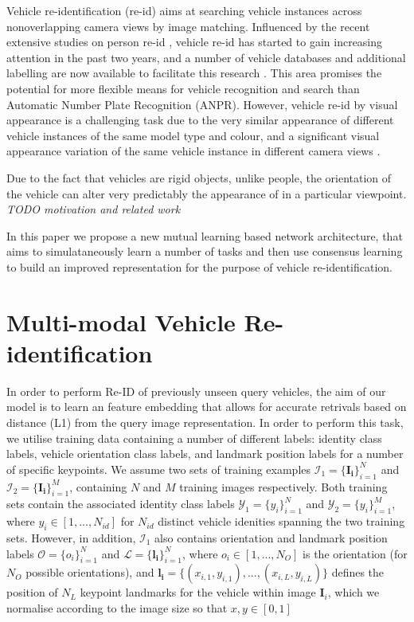 \documentclass[10pt,twocolumn,letterpaper]{article}
\begin{document}
Vehicle re-identification (re-id) aims at searching vehicle instances across nonoverlapping camera views by image matching. Influenced by the recent extensive studies on person re-id \cite{gong2014re}, vehicle re-id has started to gain increasing attention in the past two years, and a number of vehicle databases and additional labelling are now available to facilitate this research \cite{liu2016vehicleid,liu2016veri,yang2015large,kanaci2018vehicle,wang2017orientation}. This area promises the potential for more flexible means for vehicle recognition and search than Automatic Number Plate Recognition (ANPR). However, vehicle re-id by visual appearance is a
challenging task due to the very similar appearance of different vehicle instances
of the same model type and colour, and a significant visual appearance variation
of the same vehicle instance in different camera views \cite{}.


Due to the fact that vehicles are rigid objects, unlike people, the orientation of the vehicle can alter very predictably the appearance of in a particular viewpoint. \emph{TODO motivation and related work}

In this paper we propose a new mutual learning based network architecture, that aims to simulataneously learn a number of tasks and then use consensus learning to build an improved representation for the purpose of vehicle re-identification.

\section{Multi-modal Vehicle Re-identification}

In order to perform Re-ID of previously unseen query vehicles, the aim of our model is to learn an feature embedding that allows for accurate retrivals based on distance (\eg L1) from the query image representation. In order to perform this task, we utilise training data containing a number of different labels: identity class labels, vehicle orientation class labels, and landmark position labels for a number of specific keypoints. We assume two sets of training examples $\mathcal{I}_1 = \{\mathbf{I_i}\}_{i=1}^N$ and $\mathcal{I}_2 = \{\mathbf{I_i}\}_{i=1}^M$, containing $N$ and $M$ training images respectively. Both training sets contain the associated identity class labels $\mathcal{Y}_1=\{y_i\}_{i=1}^N$ and $\mathcal{Y}_2=\{y_i\}_{i=1}^M$, where $y_i \in \left[1,...,N_{id}\right]$ for $N_{id}$ distinct vehicle idenities spanning the two training sets. However, in addition, $\mathcal{I}_1$ also contains orientation and landmark position labels $\mathcal{O}=\{o_i\}_{i=1}^N$ and $\mathcal{L}=\{\mathbf{l_i}\}_{i=1}^N$, where $o_i \in \left[1,...,N_O\right]$ is the orientation (for $N_O$ possible orientations), and  $\mathbf{l_i}=\{\left(x_{i,1},y_{i,1}\right),...,\left(x_{i,L},y_{i,L}\right)\}$ defines the position of $N_L$ keypoint landmarks for the vehicle within image $\mathbf{I}_i$, which we normalise according to the image size so that $x,y \in [0,1]$
\end{document}
